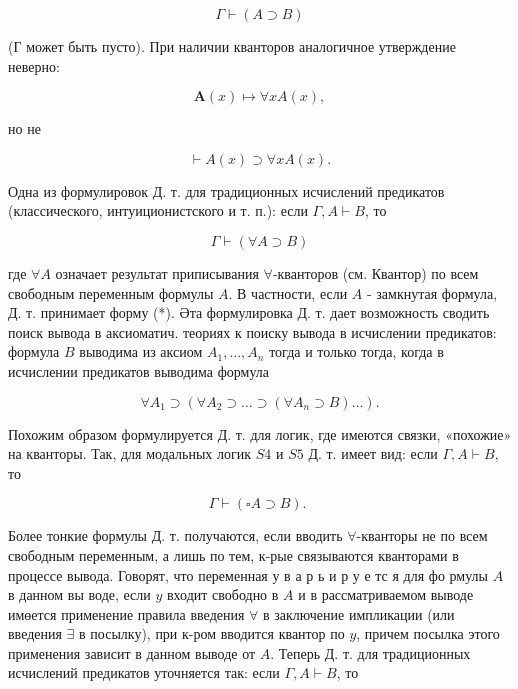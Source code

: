 \documentclass[10pt]{article}
\begin{document}
\[

\Gamma \vdash(A \supset B)

\]



(Г может быть пусто). При наличии кванторов аналогичное утверждение неверно:



\[

\boldsymbol{A}(x) \longmapsto \forall x A(x),

\]



но не



\[

\vdash A(x) \supset \forall x A(x) .

\]



Одна из формулировок Д. т. для традиционных исчислений предикатов (классического, интуиционистского и т. п.): если $\Gamma, A \vdash B$, то



\[

\Gamma \vdash(\forall A \supset B)

\]



где $\forall A$ означает результат приписывания $\forall$-кванторов (см. Квантор) по всем свободным переменным формулы $A$. В частности, если $A$ - замкнутая формула, Д. т. принимает форму (*). Әта формулировка Д. т. дает возможность сводить поиск вывода в аксиоматич. теориях к поиску вывода в исчислении предикатов: формула $B$ выводима из аксиом $A_{1}, \ldots, A_{n}$ тогда и только тогда, когда в исчислении предикатов выводима формула



\[

\forall A_{1} \supset\left(\forall A_{2} \supset \ldots \supset\left(\forall A_{n} \supset B\right) \ldots\right) .

\]



Похожим образом формулируется Д. т. для логик, где имеются связки, «похожие» на кванторы. Так, для модальных логик $S 4$ и $S 5$ Д. т. имеет вид: если $\Gamma, A \vdash B$, то



\[

\Gamma \vdash(\square A \supset B) \text {. }

\]



Более тонкие формулы Д. т. получаются, если вводить $\forall$-кванторы не по всем свободным переменным, а лишь по тем, к-рые связываются кванторами в процессе вывода. Говорят, что переменная у в а р ь и р у е тс я для фо рмулы $A$ в данном вы воде, если $y$ входит свободно в $A$ и в рассматриваемом выводе имөется применение правила введения $\forall$ в заключение импликации (или введения $\exists$ в посылку), при к-ром вводится квантор по $y$, причем посылка этого применения зависит в данном выводе от $A$. Теперь Д. т. для традиционных исчислений предикатов уточняется так: если $\Gamma, A \vdash B$, то
\end{document}
